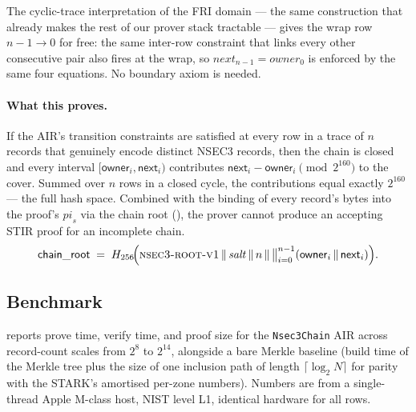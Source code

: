 \documentclass[11pt,a4paper]{article}
\theoremstyle{definition}
\theoremstyle{plain}
\newcommand{\hash}{\ensuremath{H}}
\newcommand{\concat}{\,\Vert\,}
\begin{document}
The cyclic-trace interpretation of the FRI domain — the same
construction that already makes the rest of our prover stack tractable
— gives the wrap row $n - 1 \to 0$ for free: the same inter-row
constraint that links every other consecutive pair also fires at the
wrap, so $\mathit{next}_{n-1} = \mathit{owner}_0$ is enforced by the
same four equations.  No boundary axiom is needed.

\paragraph{What this proves.}  If the AIR's transition constraints are
satisfied at every row in a trace of $n$ records that genuinely encode
distinct NSEC3 records, then the chain is closed and every interval
$[\mathsf{owner}_i, \mathsf{next}_i)$ contributes
$\mathsf{next}_i - \mathsf{owner}_i \pmod{2^{160}}$ to the cover.
Summed over $n$ rows in a closed cycle, the contributions equal exactly
$2^{160}$ — the full hash space.  Combined with the binding of every
record's bytes into the proof's $\mathit{pi}_s$ via the chain root
(), the prover cannot produce an accepting STIR
proof for an incomplete chain.
\begin{equation}
  \mathsf{chain\_root} \;=\; \hash_{256}\!\Bigl(\textsc{nsec3-root-v1}
       \concat \mathit{salt}
       \concat n
       \concat \bigl\lVert_{i=0}^{n-1}
                  (\mathsf{owner}_i \concat \mathsf{next}_i)\bigr.\Bigr).
  \label{eq:chain-root}
\end{equation}

\subsection{Benchmark}
\label{sec:nsec3-bench}

 reports prove time, verify time, and proof
size for the \texttt{Nsec3Chain} AIR across record-count scales from
$2^8$ to $2^{14}$, alongside a bare Merkle baseline (build time of
the Merkle tree plus the size of one inclusion path of length
$\lceil \log_2 N \rceil$ for parity with the STARK's amortised
per-zone numbers).  Numbers are from a single-thread Apple M-class
host, NIST level L1, identical hardware for all rows.
\end{document}
